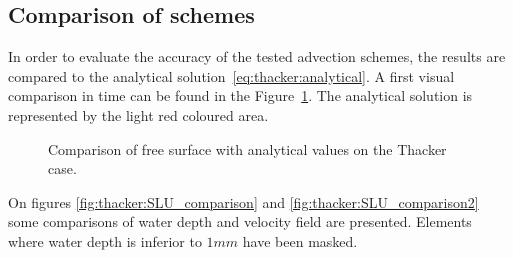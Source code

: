 \subsection{Comparison of schemes}

In order to evaluate the accuracy of the tested advection schemes, the results are compared to the analytical solution~\ref{eq:thacker:analytical}.
A first visual comparison in time can be found in the Figure~\ref{fig:thacker:SLTime}.
The analytical solution is represented by the light red coloured area.

\begin{figure}[H]
\begin{minipage}[t]{0.5\textwidth}
 \centering
\end{minipage}%
\begin{minipage}[t]{0.5\textwidth}
 \centering
\end{minipage}
\begin{minipage}[t]{0.5\textwidth}
 \centering
\end{minipage}%
\begin{minipage}[t]{0.5\textwidth}
 \centering
\end{minipage}
  \caption{Comparison of free surface with analytical values on the Thacker case.}
  \label{fig:thacker:SLTime}
\end{figure}

On figures \ref{fig:thacker:SLU_comparison} and \ref{fig:thacker:SLU_comparison2}
some comparisons of water depth and velocity field are presented. Elements where water depth is inferior to $1mm$ have been masked.

